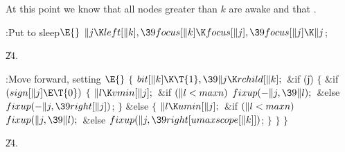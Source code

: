 At this point we know that all nodes greater than $k$ are awake and
that .

\Y\B\4:Put  to sleep\X${}\E{}$\6
$\|j\K\\{left}[\|k],\39\\{focus}[\|k]\K\\{focus}[\|j],\39\\{focus}[\|j]\K%
\|j{}$;\par
\U24.\fi

\B{}:Move forward, setting \X${}\E{}$\6
${}\{{}$\1\6
${}\\{bit}[\|k]\K\T{1},\39\|j\K\\{rchild}[\|k];{}$\6
\&{if} (\|j)\5
${}\{{}$\1\6
\&{if} ${}(\\{sign}[\|j]\E\T{0}){}$\5
${}\{{}$\1\6
${}\|l\K\\{vmin}[\|j];{}$\6
\&{if} ${}(\|l<\\{maxn}){}$\1\5
${}\\{fixup}({-}\|j,\39\|l);{}$\2\6
\&{else}\1\5
${}\\{fixup}({-}\|j,\39\\{right}[\|j]){}$;\2\6
\4${}\}{}$\5
\2\&{else}\5
${}\{{}$\1\6
${}\|l\K\\{umin}[\|j];{}$\6
\&{if} ${}(\|l<\\{maxn}){}$\1\5
${}\\{fixup}(\|j,\39\|l);{}$\2\6
\&{else}\1\5
${}\\{fixup}(\|j,\39\\{right}[\\{umaxscope}[\|k]]){}$;\2\6
\4${}\}{}$\2\6
\4${}\}{}$\2\6
\4${}\}{}$\2\par
\U24.\fi

